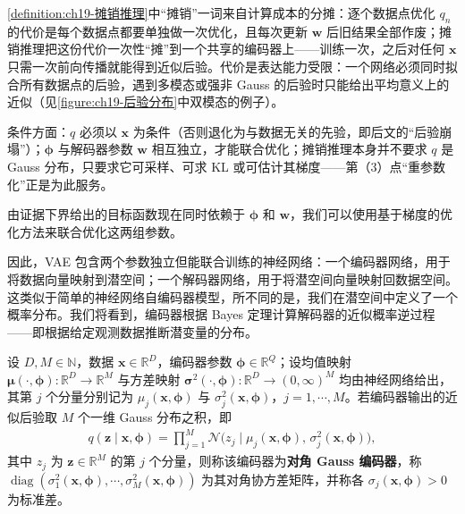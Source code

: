 \documentclass[../../main.tex]{subfiles}
\begin{document}
\begin{remark}
\cref{definition:ch19-摊销推理}中“摊销”一词来自计算成本的分摊：逐个数据点优化 $q_n$ 的代价是每个数据点都要单独做一次优化，且每次更新 $\bm{w}$ 后旧结果全部作废；摊销推理把这份代价一次性“摊”到一个共享的编码器上——训练一次，之后对任何 $\bm{x}$ 只需一次前向传播就能得到近似后验。代价是表达能力受限：一个网络必须同时拟合所有数据点的后验，遇到多模态或强非 Gauss 的后验时只能给出平均意义上的近似（见\cref{figure:ch19-后验分布}中双模态的例子）。

条件方面：$q$ 必须以 $\bm{x}$ 为条件（否则退化为与数据无关的先验，即后文的“后验崩塌”）；$\bm{\phi}$ 与解码器参数 $\bm{w}$ 相互独立，才能联合优化；摊销推理本身并不要求 $q$ 是 Gauss 分布，只要求它可采样、可求 KL 或可估计其梯度——第（3）点“重参数化”正是为此服务。
\end{remark}

由证据下界给出的目标函数现在同时依赖于 $\bm{\phi}$ 和 $\bm{w}$，我们可以使用基于梯度的优化方法来联合优化这两组参数。

因此，VAE 包含两个参数独立但能联合训练的神经网络：一个编码器网络，用于将数据向量映射到潜空间；一个解码器网络，用于将潜空间向量映射回数据空间。这类似于简单的神经网络自编码器模型，所不同的是，我们在潜空间中定义了一个概率分布。我们将看到，编码器根据 Bayes 定理计算解码器的近似概率逆过程——即根据给定观测数据推断潜变量的分布。

\begin{definition}\label{definition:ch19-对角Gauss编码器}
设 $D,M\in\mathbb{N}$，数据 $\bm{x}\in\mathbb{R}^{D}$，编码器参数 $\bm{\phi}\in\mathbb{R}^{Q}$；设均值映射 $\bm{\mu}(\cdot,\bm{\phi}):\mathbb{R}^{D}\to\mathbb{R}^{M}$ 与方差映射 $\bm{\sigma}^{2}(\cdot,\bm{\phi}):\mathbb{R}^{D}\to(0,\infty)^{M}$ 均由神经网络给出，其第 $j$ 个分量分别记为 $\mu_{j}(\bm{x},\bm{\phi})$ 与 $\sigma_{j}^{2}(\bm{x},\bm{\phi})$，$j=1,\cdots,M$。若编码器输出的近似后验取 $M$ 个一维 Gauss 分布之积，即
\begin{align}
q(\bm{z}\mid\bm{x},\bm{\phi})=\prod_{j=1}^{M}\mathcal{N}\big(z_j\mid\mu_j(\bm{x},\bm{\phi}),\,\sigma_j^{2}(\bm{x},\bm{\phi})\big),
\label{align:ch19-编码器}
\end{align}
其中 $z_{j}$ 为 $\bm{z}\in\mathbb{R}^{M}$ 的第 $j$ 个分量，则称该编码器为\textbf{对角 Gauss 编码器}，称 $\operatorname{diag}(\sigma_{1}^{2}(\bm{x},\bm{\phi}),\cdots,\sigma_{M}^{2}(\bm{x},\bm{\phi}))$ 为其对角协方差矩阵，并称各 $\sigma_{j}(\bm{x},\bm{\phi})>0$ 为标准差。
\end{definition}
\end{document}
